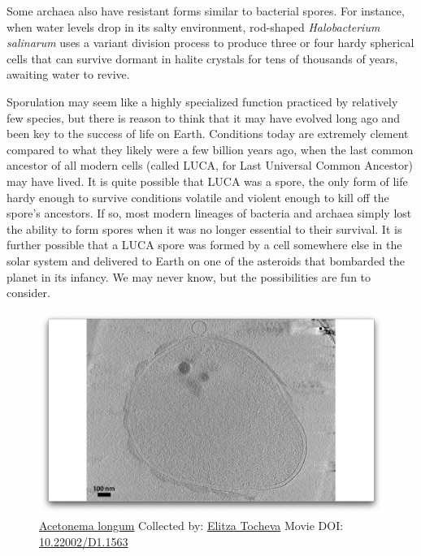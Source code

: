\documentclass[]{tufte-book}
\begin{document}
Some archaea also have resistant forms similar to bacterial spores. For
instance, when water levels drop in its salty environment, rod-shaped
\emph{Halobacterium salinarum} uses a variant division process to
produce three or four hardy spherical cells that can survive dormant in
halite crystals for tens of thousands of years, awaiting water to
revive.

Sporulation may seem like a highly specialized function practiced by
relatively few species, but there is reason to think that it may have
evolved long ago and been key to the success of life on Earth.
Conditions today are extremely clement compared to what they likely were
a few billion years ago, when the last common ancestor of all modern
cells (called LUCA, for Last Universal Common Ancestor) may have lived.
It is quite possible that LUCA was a spore, the only form of life hardy
enough to survive conditions volatile and violent enough to kill off the
spore's ancestors. If so, most modern lineages of bacteria and archaea
simply lost the ability to form spores when it was no longer essential
to their survival. It is further possible that a LUCA spore was formed
by a cell somewhere else in the solar system and delivered to Earth on
one of the asteroids that bombarded the planet in its infancy. We may
never know, but the possibilities are fun to consider.





\begin{figure}
\includegraphics{movie_stills/8_11} \caption[\protect\hyperlink{tree}{Acetonema longum} Collected by:
\protect\hyperlink{elitza_tocheva}{Elitza Tocheva} Movie DOI:
\href{https://doi.org/10.22002/D1.1563}{10.22002/D1.1563}]{\protect\hyperlink{tree}{Acetonema longum} Collected by:
\protect\hyperlink{elitza_tocheva}{Elitza Tocheva} Movie DOI:
\href{https://doi.org/10.22002/D1.1563}{10.22002/D1.1563}}\label{fig:8-11}
\end{figure}
\end{document}

